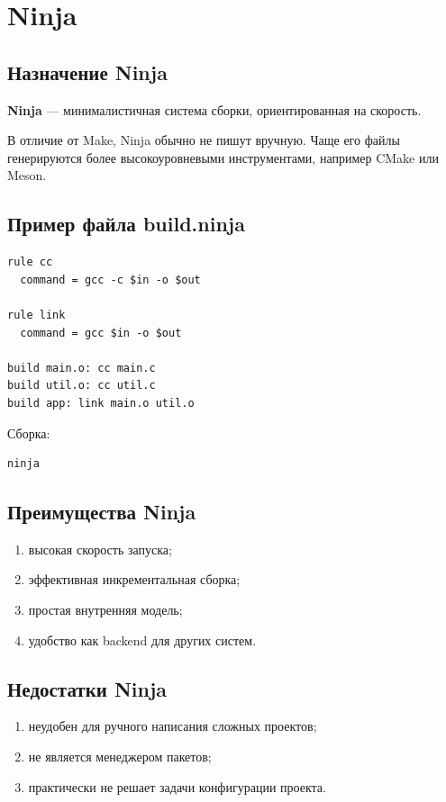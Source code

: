 \documentclass[12pt,a4paper]{article}
\begin{document}
\section{Ninja}

\subsection{Назначение Ninja}

\textbf{Ninja} --- минималистичная система сборки, ориентированная на скорость.

В отличие от Make, Ninja обычно не пишут вручную. Чаще его файлы генерируются более высокоуровневыми инструментами, например CMake или Meson.

\subsection{Пример файла build.ninja}

\begin{lstlisting}
rule cc
  command = gcc -c $in -o $out

rule link
  command = gcc $in -o $out

build main.o: cc main.c
build util.o: cc util.c
build app: link main.o util.o
\end{lstlisting}

Сборка:

\begin{lstlisting}
ninja
\end{lstlisting}

\subsection{Преимущества Ninja}

\begin{enumerate}
    \item высокая скорость запуска;
    \item эффективная инкрементальная сборка;
    \item простая внутренняя модель;
    \item удобство как backend для других систем.
\end{enumerate}

\subsection{Недостатки Ninja}

\begin{enumerate}
    \item неудобен для ручного написания сложных проектов;
    \item не является менеджером пакетов;
    \item практически не решает задачи конфигурации проекта.
\end{enumerate}
\end{document}
